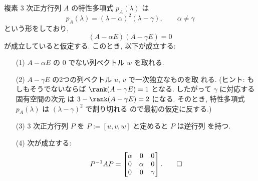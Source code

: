 \documentclass[12pt,twoside]{jarticle}
\begin{document}
\begin{question}[15点]
  \label{q:normal-form-3.3}
  複素 $3$ 次正方行列 $A$ の特性多項式 $p_A(\lambda)$ は
  \begin{equation*}
    p_A(\lambda) = (\lambda - \alpha)^2 (\lambda - \gamma),
    \qquad \alpha \ne \gamma
  \end{equation*}
  という形をしており,
  \begin{equation*}
    (A - \alpha E)(A - \gamma E) = 0
  \end{equation*}
  が成立していると仮定する.  このとき, 以下が成立する:
  \begin{enumerate}
  \item[(1)] $A - \alpha E$ の $0$ でない列ベクトル $w$ を取れる.
  \item[(2)] $A - \gamma E$ の2つの列ベクトル $u$, $v$ で一次独立なものを取
    れる.
    (ヒント: もしもそうでないならば $\rank(A - \gamma E) = 1$ となる.
    したがって $\gamma$ に対応する固有空間の次元
    は $3-\rank(A - \gamma E)=2$ になる.  そのとき, 
    特性多項式 $p_A(\lambda)$ は $(\lambda-\gamma)^2$ で割り切れる
    ので最初の仮定に反する.)
  \item[(3)] $3$ 次正方行列 $P$ を $P := [u, v, w]$ と定めると $P$ は逆行列
    を持つ. 
  \item[(4)] 次が成立する:
    \begin{equation*}
      P^{-1} A P 
      = 
      \begin{bmatrix}
        \alpha & 0 & 0 \\
        0 & \alpha & 0 \\
        0 & 0 & \gamma \\
      \end{bmatrix}.
      \qed
    \end{equation*}
  \end{enumerate}
\end{question}

\end{document}
